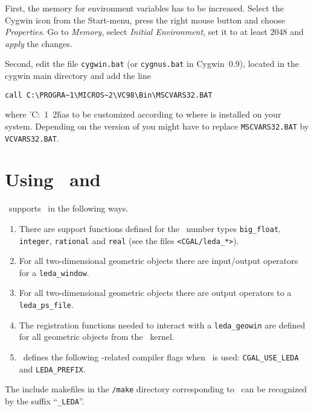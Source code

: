 First, the memory for environment variables has to be increased.
Select the Cygwin icon from the Start-menu, press the right mouse
button and choose \textit{Properties}. Go to \textit{Memory}, select
\textit{Initial Environment}, set it to at least 2048 and
\textit{apply} the changes.

Second, edit the file \texttt{cygwin.bat} (or \texttt{cygnus.bat} in
Cygwin~0.9), located in the cygwin main directory and add the line
\begin{verbatim}
call C:\PROGRA~1\MICROS~2\VC98\Bin\MSCVARS32.BAT
\end{verbatim}
where
\nonlinkedpath'C:\PROGRA~1\MICROS~2\'
has to be customized according to where \msvc{} is installed on your
system. Depending on the version of \msvc{} you might have to replace
\texttt{MSCVARS32.BAT} by \texttt{VCVARS32.BAT}.

\lcTex{\begin{appendix}}

\section{Using \cgal\ and \leda}\label{sec:leda}
\cgal\ supports \leda\ in the following ways.

\begin{enumerate}
\item There are support functions defined for the \leda\ number types
  \texttt{big\_float}, \texttt{integer}, \texttt{rational} and
  \texttt{real} (see the files \texttt{<CGAL/leda\_*>}).
\item For all two-dimensional geometric objects there are input/output
  operators for a \texttt{leda\_window}.
\item For all two-dimensional geometric objects there are output
  operators to a \texttt{leda\_ps\_file}.
\item The registration functions needed to interact with a
  \texttt{leda\_geowin} are defined for all geometric objects from the
  \cgal\ kernel.
\item \cgal\ defines the following \leda-related compiler flags when
      \leda\ is used: \texttt{CGAL\_USE\_LEDA} and \texttt{LEDA\_PREFIX}.
\end{enumerate}

The include makefiles in the \texttt{\cgaldir/make} directory
corresponding to \leda\ can be recognized by the suffix
``\texttt{\_LEDA}''.

